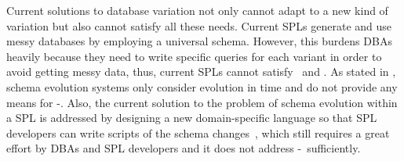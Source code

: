 
Current solutions to database variation not only cannot adapt to a new
kind of variation but also cannot satisfy all these needs.
Current SPLs generate and use messy 
databases by employing a universal schema.
However, this burdens DBAs heavily because they need to write specific
queries for each variant in order to avoid getting messy data, thus,
current SPLs cannot satisfy \nOne\ and \nTwo.
%
As stated in , schema evolution systems only consider evolution
in time and do not provide any means for \nOne-\nThree.
%
Also, the current solution to the problem of schema evolution within a SPL is addressed by
designing
a new domain-specific language so that SPL developers 
can write scripts of the schema changes~\cite{dbSPLevolve},
which still requires a great effort by DBAs and SPL developers
and it does not address \nZero-\nTwo\ sufficiently.




\begin{comment}
writing workshop Oct. 7:
motivating example
-early in the paper
-somehow convincing
-realistic
-small
-show off solution. show how you solve it later.

\end{comment}
